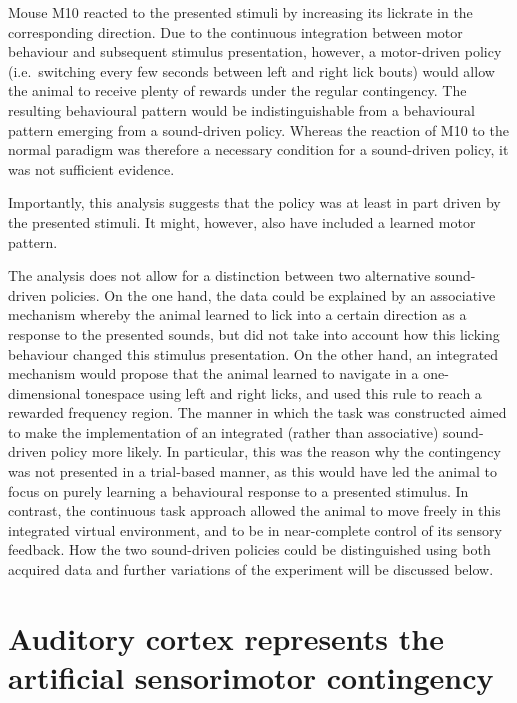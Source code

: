 \documentclass[]{report}
\theoremstyle{definition}
\theoremstyle{definition}
\theoremstyle{definition}
\theoremstyle{remark}
\begin{document}
Mouse M10 reacted to the presented stimuli by increasing its lickrate in
the corresponding direction. Due to the continuous integration between
motor behaviour and subsequent stimulus presentation, however, a
motor-driven policy (i.e.~switching every few seconds between left and
right lick bouts) would allow the animal to receive plenty of rewards
under the regular contingency. The resulting behavioural pattern would
be indistinguishable from a behavioural pattern emerging from a
sound-driven policy. Whereas the reaction of M10 to the normal paradigm
was therefore a necessary condition for a sound-driven policy, it was
not sufficient evidence.

Importantly, this analysis suggests that the policy was at least in part
driven by the presented stimuli. It might, however, also have included a
learned motor pattern.

The analysis does not allow for a distinction between two alternative
sound-driven policies. On the one hand, the data could be explained by
an associative mechanism whereby the animal learned to lick into a
certain direction as a response to the presented sounds, but did not
take into account how this licking behaviour changed this stimulus
presentation. On the other hand, an integrated mechanism would propose
that the animal learned to navigate in a one-dimensional tonespace using
left and right licks, and used this rule to reach a rewarded frequency
region. The manner in which the task was constructed aimed to make the
implementation of an integrated (rather than associative) sound-driven
policy more likely. In particular, this was the reason why the
contingency was not presented in a trial-based manner, as this would
have led the animal to focus on purely learning a behavioural response
to a presented stimulus. In contrast, the continuous task approach
allowed the animal to move freely in this integrated virtual
environment, and to be in near-complete control of its sensory feedback.
How the two sound-driven policies could be distinguished using both
acquired data and further variations of the experiment will be discussed
below.

\hypertarget{auditory-cortex-represents-the-artificial-sensorimotor-contingency}{%
\section{Auditory cortex represents the artificial sensorimotor
contingency}\label{auditory-cortex-represents-the-artificial-sensorimotor-contingency}}
\end{document}
